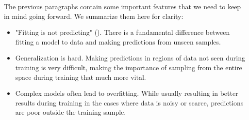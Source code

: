 The previous paragraphs contain some important features that we need to keep in mind going forward. We summarize them here for clarity: 
\begin{itemize}
\item "Fitting is not predicting" (\cite{Mehta2019}). There is a fundamental difference between fitting a model to data and making predictions from unseen samples. \\
\item Generalization is hard. Making predictions in regions of data not seen during training is very difficult, making the importance of sampling from the entire space during training that much more vital. \\
\item Complex models often lead to overfitting. While usually resulting in better results during training in the cases where data is noisy or scarce, predictions are poor outside the training sample. 
\end{itemize}


